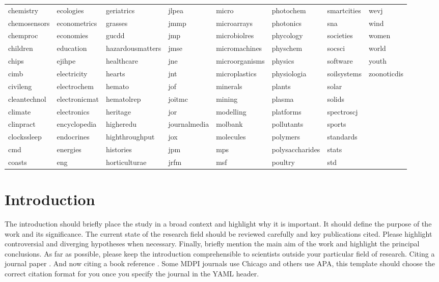 \documentclass[atmosphere,article,submit,moreauthors,pdftex]{Definitions/mdpi}
\begin{document}
\begin{longtable}[t]{llllllll}
chemistry & ecologies & geriatrics & jlpea & micro & photochem & smartcities & wevj\\
\addlinespace
chemosensors & econometrics & grasses & jmmp & microarrays & photonics & sna & wind\\
chemproc & economies & gucdd & jmp & microbiolres & phycology & societies & women\\
children & education & hazardousmatters & jmse & micromachines & physchem & socsci & world\\
chips & ejihpe & healthcare & jne & microorganisms & physics & software & youth\\
cimb & electricity & hearts & jnt & microplastics & physiologia & soilsystems & zoonoticdis\\
\addlinespace
civileng & electrochem & hemato & jof & minerals & plants & solar & \\
cleantechnol & electronicmat & hematolrep & joitmc & mining & plasma & solids & \\
climate & electronics & heritage & jor & modelling & platforms & spectroscj & \\
clinpract & encyclopedia & higheredu & journalmedia & molbank & pollutants & sports & \\
clockssleep & endocrines & highthroughput & jox & molecules & polymers & standards & \\
\addlinespace
cmd & energies & histories & jpm & mps & polysaccharides & stats & \\
coasts & eng & horticulturae & jrfm & msf & poultry & std & \\
\bottomrule
\end{longtable}
\finishlandscape

\section{Introduction}\label{introduction-1}

The introduction should briefly place the study in a broad context and
highlight why it is important. It should define the purpose of the work
and its significance. The current state of the research field should be
reviewed carefully and key publications cited. Please highlight
controversial and diverging hypotheses when necessary. Finally, briefly
mention the main aim of the work and highlight the principal
conclusions. As far as possible, please keep the introduction
comprehensible to scientists outside your particular field of research.
Citing a journal paper
\citep{bertrand-krajewski_distribution_1998, leutnant_stormwater_2016}.
And now citing a book reference \citet{gujer_systems_2008}. Some MDPI
journals use Chicago and others use APA, this template should choose the
correct citation format for you once you specify the journal in the YAML
header.
\end{document}
